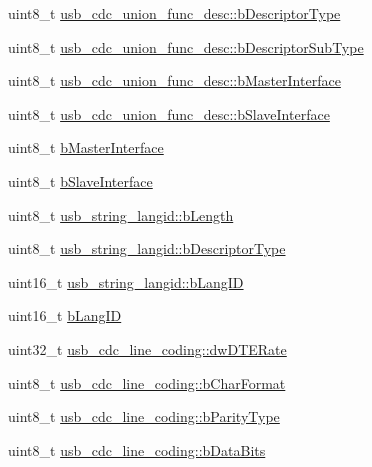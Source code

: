 \begin{DoxyCompactItemize}
\item 
uint8\-\_\-t \hyperlink{group___p_i_o_s___u_s_b___d_e_f_s_ga1f7c70ea92f6b53756b96cb3b3d791c6}{usb\-\_\-cdc\-\_\-union\-\_\-func\-\_\-desc\-::b\-Descriptor\-Type}
\item 
uint8\-\_\-t \hyperlink{group___p_i_o_s___u_s_b___d_e_f_s_ga5784c9fea0c30db9be3ed5d38e02c4b7}{usb\-\_\-cdc\-\_\-union\-\_\-func\-\_\-desc\-::b\-Descriptor\-Sub\-Type}
\item 
uint8\-\_\-t \hyperlink{group___p_i_o_s___u_s_b___d_e_f_s_ga9194ac785cd0cc798e0a438dbcab9062}{usb\-\_\-cdc\-\_\-union\-\_\-func\-\_\-desc\-::b\-Master\-Interface}
\item 
uint8\-\_\-t \hyperlink{group___p_i_o_s___u_s_b___d_e_f_s_ga9cfe098c280a95412143266a948eb290}{usb\-\_\-cdc\-\_\-union\-\_\-func\-\_\-desc\-::b\-Slave\-Interface}
\item 
uint8\-\_\-t \hyperlink{group___p_i_o_s___u_s_b___d_e_f_s_ga4ab108f916e137502b55f0324e594963}{b\-Master\-Interface}
\item 
uint8\-\_\-t \hyperlink{group___p_i_o_s___u_s_b___d_e_f_s_gae9505f80bd091509e065986a7b9af9ac}{b\-Slave\-Interface}
\item 
uint8\-\_\-t \hyperlink{group___p_i_o_s___u_s_b___d_e_f_s_ga5d1ac83f6f30a062e5f6d89c4aa15c44}{usb\-\_\-string\-\_\-langid\-::b\-Length}
\item 
uint8\-\_\-t \hyperlink{group___p_i_o_s___u_s_b___d_e_f_s_gafbb47b004fd7a76505e51c1f1530351f}{usb\-\_\-string\-\_\-langid\-::b\-Descriptor\-Type}
\item 
uint16\-\_\-t \hyperlink{group___p_i_o_s___u_s_b___d_e_f_s_ga0a47e7587d6595703617971546741a5f}{usb\-\_\-string\-\_\-langid\-::b\-Lang\-I\-D}
\item 
uint16\-\_\-t \hyperlink{group___p_i_o_s___u_s_b___d_e_f_s_gae9f9ee602591bc9fbf16645639988db1}{b\-Lang\-I\-D}
\item 
uint32\-\_\-t \hyperlink{group___p_i_o_s___u_s_b___d_e_f_s_gabba439cd113503e9223c9d61865319d2}{usb\-\_\-cdc\-\_\-line\-\_\-coding\-::dw\-D\-T\-E\-Rate}
\item 
uint8\-\_\-t \hyperlink{group___p_i_o_s___u_s_b___d_e_f_s_gaae309443995f9fe84f44a78bd866cc1a}{usb\-\_\-cdc\-\_\-line\-\_\-coding\-::b\-Char\-Format}
\item 
uint8\-\_\-t \hyperlink{group___p_i_o_s___u_s_b___d_e_f_s_gad1b91d6baa7411fa9f6341140f5ac216}{usb\-\_\-cdc\-\_\-line\-\_\-coding\-::b\-Parity\-Type}
\item 
uint8\-\_\-t \hyperlink{group___p_i_o_s___u_s_b___d_e_f_s_ga81e0e896a0524b8db945e1a8b50668e6}{usb\-\_\-cdc\-\_\-line\-\_\-coding\-::b\-Data\-Bits}

\end{DoxyCompactItemize}
